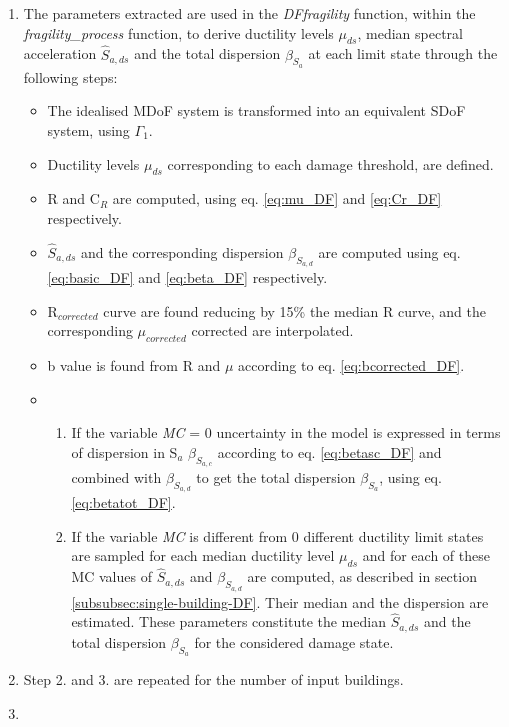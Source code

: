 {\begin{enumerate}
\item The parameters extracted are used in the \textit{DFfragility} function, within the \textit{fragility\_process} function, to derive ductility levels $\mu_{ds}$, median spectral acceleration $\hat{S}_{a,ds}$ and the total dispersion $\beta_{S_a}$ at each limit state through the following steps:
\begin{itemize}
\item The idealised MDoF system is transformed into an equivalent SDoF system, using $\Gamma_1$.
\item Ductility levels $\mu_{ds}$ corresponding to each damage threshold, are defined.
\item R and C$_R$ are computed, using eq. \ref{eq:mu_DF} and \ref{eq:Cr_DF} respectively.
\item $\hat{S}_{a,ds}$ and the corresponding dispersion  $\beta_{S_{a, d}}$ are computed using eq. \ref{eq:basic_DF} and \ref{eq:beta_DF} respectively.
\item R$_{corrected}$ curve are found reducing by 15\% the median R curve, and the corresponding $\mu_{corrected}$ corrected are interpolated.
\item b value is found from R and $\mu$ according to eq. \ref{eq:bcorrected_DF}.

\item
\begin{enumerate}
\item If the variable \textit{MC} = 0 uncertainty in the model is expressed in terms of dispersion in S$_a$ $\beta_{S_{a, c}}$ according to eq. \ref{eq:betasc_DF} and combined with $\beta_{S_{a, d}}$ to get the total dispersion $\beta_{S_a}$, using eq. \ref{eq:betatot_DF}.
\item If the variable \textit{MC} is different from 0 different ductility limit states are sampled for each median ductility level $\mu_{ds}$ and for each of these MC values of $\hat{S}_{a,ds}$ and $\beta_{S_{a, d}}$ are computed, as described in section \ref{subsubsec:single-building-DF}. Their median and the dispersion are estimated. These parameters constitute the median $\hat{S}_{a,ds}$ and the total dispersion $\beta_{S_a}$ for the considered damage state. 
\end{enumerate}

\end{itemize}

\item Step 2. and 3. are repeated for the number of input buildings.

\item
\begin{enumerate}


\end{enumerate}
\end{enumerate}}
